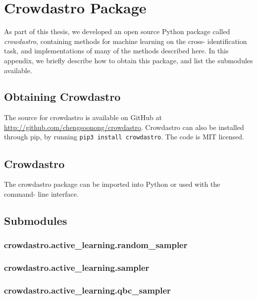 
\appendix
\chapter{Crowdastro Package}
\label{cha:crowdastro}

As part of this thesis, we developed an open source Python package called
\emph{crowdastro}, containing methods for machine learning on the cross-
identification task, and implementations of many of the methods described here.
In this appendix, we briefly describe how to obtain this package, and list the
submodules available.

\section{Obtaining Crowdastro}

    The source for crowdastro is available on GitHub at
    \url{http://github.com/chengsoonong/crowdastro}. Crowdastro can also be
    installed through pip, by running \texttt{pip3 install crowdastro}. The code
    is MIT licensed.

\section{Crowdastro}

    The crowdastro package can be imported into Python or used with the command-
    line interface.


\section{Submodules}
    \label{sec:crowdastro-submodules}

    \subsection{crowdastro.active\_learning.random\_sampler}
        \label{sec:crowdastro-random-sampler}
    \subsection{crowdastro.active\_learning.sampler}
        \label{sec:crowdastro-sampler}
    \subsection{crowdastro.active\_learning.qbc\_sampler}
        \label{sec:crowdastro-qbc-sampler}
